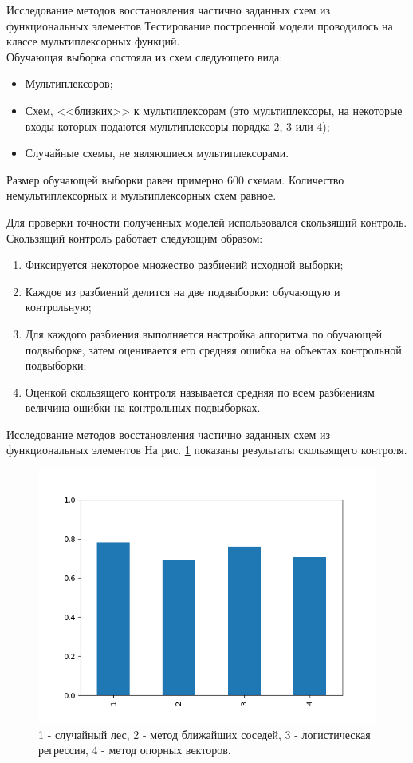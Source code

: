 \documentclass[serif,utf8]{beamer}
\begin{document}
\begin{frame}{Исследование методов восстановления частично заданных схем из функциональных элементов}
Тестирование построенной модели проводилось на классе мультиплексорных функций.\\
Обучающая выборка состояла из схем следующего вида:
\begin{itemize}
\item Мультиплексоров;
\item Схем, <<близких>> к мультиплексорам (это мультиплексоры, на некоторые входы которых подаются мультиплексоры порядка 2, 3 или 4);
\item Случайные схемы, не являющиеся мультиплексорами.
\end{itemize}
Размер обучающей выборки равен примерно 600 схемам. Количество немультиплексорных и мультиплексорных схем равное.\par
\end{frame}

\begin{frame}
Для проверки точности полученных моделей использовался скользящий контроль.
Скользящий контроль работает следующим образом:
\begin{enumerate}
\item Фиксируется некоторое множество разбиений исходной выборки; 
\item Каждое из разбиений делится на две подвыборки: обучающую и контрольную; 
\item Для каждого разбиения выполняется настройка алгоритма по обучающей подвыборке, затем оценивается его средняя ошибка на объектах контрольной подвыборки; 
\item Оценкой скользящего контроля называется средняя по всем разбиениям величина ошибки на контрольных подвыборках.
\end{enumerate}
\end{frame}

\begin{frame}{Исследование методов восстановления частично заданных схем из функциональных элементов}
На рис. \ref{picCV} показаны результаты скользящего контроля.\par
\begin{figure}[h!]
   \centering
   \includegraphics[width=0.7\linewidth]{cross_validation.png}
   \caption{\scriptsize{1 - случайный лес, 2 - метод ближайших соседей, 3 - логистическая регрессия, 4 - метод опорных векторов.}}
   \label{picCV}
\end{figure}
\end{frame}
\end{document}
